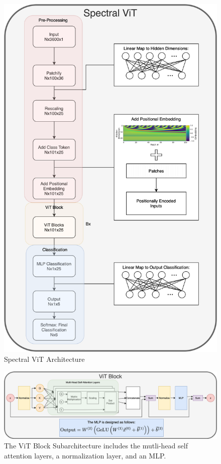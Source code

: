 \clearpage
\begin{figure}
    \centering
    \includegraphics[height=.7\pdfpageheight]{figures/TransformerDiagrams/SpectralViT.png}
    \caption{Spectral ViT Architecture}
    \label{fig:SpectralViTDiag}
\end{figure}

\begin{figure}
    \centering
    \includegraphics[width=\textwidth]{figures/TransformerDiagrams/Attention.png}
    \caption[Spectral ViT Block]{The ViT Block Subarchitecture includes the mutli-head 
    self attention layers, a normalization layer, and an MLP.}
    \label{fig:SpectralViTBlock}
\end{figure}
